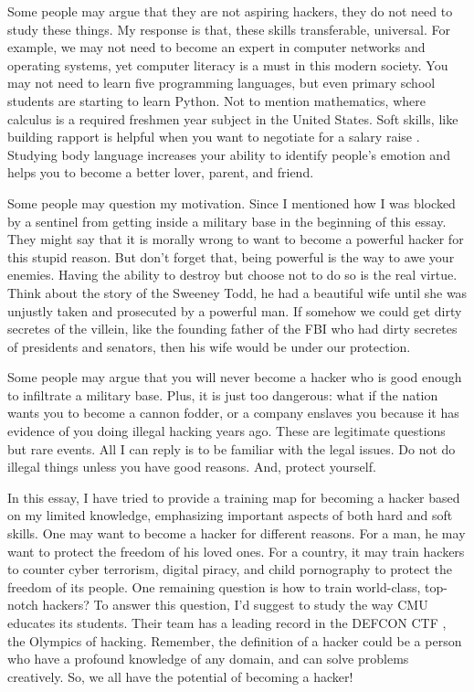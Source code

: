 \documentclass{article}
\begin{document}
Some people may argue that they are not aspiring hackers, they do not need to study these things. My response is that, these skills transferable, universal. For example, we may not need to become an expert in computer networks and operating systems, yet computer literacy is a must in this modern society. You may not need to learn five programming languages, but even primary school students are starting to learn Python. Not to mention mathematics, where calculus is a required freshmen year subject in the United States. Soft skills, like building rapport is helpful when you want to negotiate for a salary raise \cite{Voss2016}. Studying body language increases your ability to identify people's emotion and helps you to become a better lover, parent, and friend.

Some people may question my motivation. Since I mentioned how I was blocked by a sentinel from getting inside a military base in the beginning of this essay. They might say that it is morally wrong to want to become a powerful hacker for this stupid reason. But don't forget that, being powerful is the way to awe your enemies. Having the ability to destroy but choose not to do so is the real virtue. Think about the story of the Sweeney Todd, he had a beautiful wife until she was unjustly taken and prosecuted by a powerful man. If somehow we could get dirty secretes of the villein, like the founding father of the FBI who had dirty secretes of presidents and senators, then his wife would be under our protection. 

Some people may argue that you will never become a hacker who is good enough to infiltrate a military base. Plus, it is just too dangerous: what if the nation wants you to become a cannon fodder, or a company enslaves you because it has evidence of you doing illegal hacking years ago. These are legitimate questions but rare events. All I can reply is to be familiar with the legal issues. Do not do illegal things unless you have good reasons. And, protect yourself.

In this essay, I have tried to provide a training map for becoming a hacker based on my limited knowledge, emphasizing important aspects of both hard and soft skills. One may want to become a hacker for different reasons. For a man, he may want to protect the freedom of his loved ones. For a country, it may train hackers to counter cyber terrorism, digital piracy, and child pornography to protect the freedom of its people. One remaining question is how to train world-class, top-notch hackers? To answer this question, I'd suggest to study the way CMU educates its students. Their team has a leading record in the DEFCON CTF \cite{CTF}, the Olympics of hacking. Remember, the definition of a hacker could be a person who have a profound knowledge of any domain, and can solve problems creatively. So, we all have the potential of becoming a hacker!


\begin{flushleft}


\end{flushleft}
\end{document}
